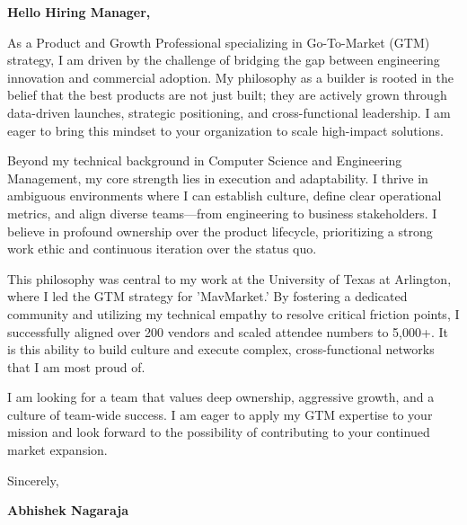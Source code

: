 \documentclass[11pt,letterpaper]{article} %
\begin{document}
\vspace{1.5em}

\textbf{Hello Hiring Manager,}

As a Product and Growth Professional specializing in Go-To-Market (GTM) strategy, I am driven by the challenge of bridging the gap between engineering innovation and commercial adoption. My philosophy as a builder is rooted in the belief that the best products are not just built; they are actively grown through data-driven launches, strategic positioning, and cross-functional leadership. I am eager to bring this mindset to your organization to scale high-impact solutions.

Beyond my technical background in Computer Science and Engineering Management, my core strength lies in execution and adaptability. I thrive in ambiguous environments where I can establish culture, define clear operational metrics, and align diverse teams—from engineering to business stakeholders. I believe in profound ownership over the product lifecycle, prioritizing a strong work ethic and continuous iteration over the status quo. 

This philosophy was central to my work at the University of Texas at Arlington, where I led the GTM strategy for 'MavMarket.' By fostering a dedicated community and utilizing my technical empathy to resolve critical friction points, I successfully aligned over 200 vendors and scaled attendee numbers to 5,000+. It is this ability to build culture and execute complex, cross-functional networks that I am most proud of.

I am looking for a team that values deep ownership, aggressive growth, and a culture of team-wide success. I am eager to apply my GTM expertise to your mission and look forward to the possibility of contributing to your continued market expansion.

\vspace{1.5em}
Sincerely,

\vspace{1.2em} %
\textbf{Abhishek Nagaraja}
\end{document}
